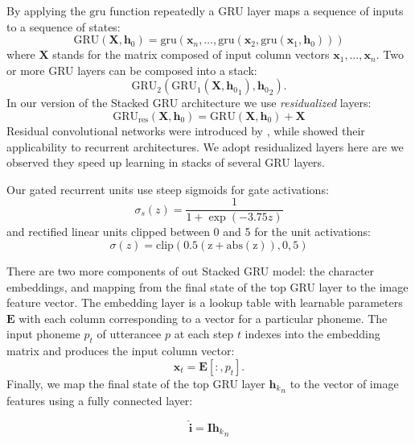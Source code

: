 By applying the $\mathrm{gru}$ function repeatedly a GRU layer maps a
sequence of inputs to a sequence of states:
\begin{equation}
  \mathrm{GRU}(\mathbf{X}, \mathbf{h}_0) = \mathrm{gru}(\mathbf{x}_n, \dots, \mathrm{gru}(\mathbf{x}_2, \mathrm{gru}(\mathbf{x}_1, \mathbf{h}_0)))
\end{equation}
where $\mathbf{X}$ stands for the matrix composed of input column vectors
$\mathbf{x}_1, \ldots, \mathbf{x}_n$. Two or more GRU layers can be composed into a stack: 
\begin{equation}
\mathrm{GRU}_2(\mathrm{GRU}_1(\mathbf{X}, {\mathbf{h}_{0}}_{1}), {\mathbf{h}_{0}}_{2}).
\end{equation}
In our version of the Stacked GRU architecture we use {\it residualized} layers:
\begin{equation}
\mathrm{GRU_{res}}(\mathbf{X}, \mathbf{h}_0) = \mathrm{GRU}(\mathbf{X}, \mathbf{h}_0) + \mathbf{X}
\end{equation}
Residual convolutional networks were introduced by
, while  showed their
applicability to recurrent architectures. We adopt residualized layers
here are we observed they speed up learning in stacks of several
GRU layers.

Our gated recurrent units use steep sigmoids for gate activations: \[
\sigma_s(z) = \frac{1}{1 + \exp(-3.75z)} 
\]
and rectified linear units clipped between 0 and 5 for the unit
activations:
\[
\sigma(z) = \mathrm{clip(0.5(z+\mathrm{abs}(z)), 0, 5)}
\]

There are two more components of out {\sc Stacked GRU} model: the
character embeddings, and mapping from the final state of the top GRU
layer to the image feature vector.
The embedding layer is a lookup table with learnable parameters $\mathbf{E}$ with each
column corresponding to a vector for a particular phoneme. The input
phoneme $p_t$ of utterancee $p$ at each step $t$ indexes into the
embedding matrix and produces the input column vector:
\begin{equation}
  \mathbf{x}_t = \mathbf{E}[:,p_t].
\end{equation}
Finally, we map the final state of the top GRU layer ${\mathbf{h}_k}_n$
to the vector of image features using a fully connected layer:

\begin{equation}
  \hat{\mathbf{i}} = \mathbf{I} {\mathbf{h}_k}_n
\end{equation}

